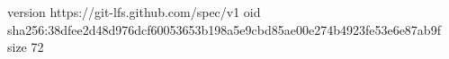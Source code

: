 version https://git-lfs.github.com/spec/v1
oid sha256:38dfee2d48d976dcf60053653b198a5e9cbd85ae00e274b4923fe53e6e87ab9f
size 72
